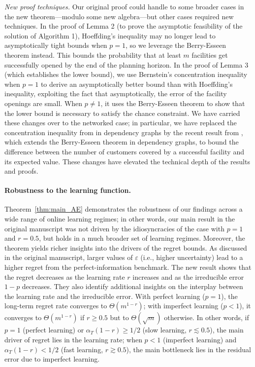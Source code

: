\documentclass[11pt]{article}
\begin{document}
\textit{New proof techniques.}
Our original proof could handle to some broader cases in the new theorem---modulo some new algebra---but other cases required new techniques. In the proof of Lemma 2 (to prove the asymptotic feasibility of the solution of Algorithm 1), Hoeffding's inequality may no longer lead to asymptotically tight bounds when $p=1$, so we leverage the Berry-Esseen theorem instead. This bounds the probability that at least $m$ facilities get successfully opened by the end of the planning horizon. In the proof of Lemma 3 (which establishes the lower bound), we use Bernstein's concentration inequality when $p=1$ to derive an asymptotically better bound than with Hoeffding's inequality, exploiting the fact that asymptotically, the error of the facility openings are small. When $p\neq1$, it uses the Berry-Esseen theorem to show that the lower bound is necessary to satisfy the chance constraint. We have carried these changes over to the networked case; in particular, we have replaced the concentration inequality from \cite{janson2004large} in dependency graphs by the recent result from \cite{janisch2024berry}, which extends the Berry-Esseen theorem in dependency graphs, to bound the difference between the number of customers covered by a successful facility and its expected value. These changes have elevated the technical depth of the results and proofs.

\paragraph{Robustness to the learning function.}

Theorem~\ref{thm:main_AE} demonstrates the robustness of our findings across a wide range of online learning regimes; in other words, our main result in the original manuscript was not driven by the idiosyncracies of the case with $p=1$ and $r=0.5$, but holds in a much broader set of learning regimes. Moreover, the theorem yields richer insights into the drivers of the regret bounds. As discussed in the original manuscript, larger values of $\varepsilon$ (i.e., higher uncertainty) lead to a higher regret from the perfect-information benchmark. The new result shows that the regret decreases as the learning rate $r$ increases and as the irreducible error $1-p$ decreases. They also identify additional insights on the interplay between the learning rate and the irreducible error. With perfect learning ($p=1$), the long-term regret rate converges to $\Theta\left(m^{1-r}\right)$; with imperfect learning ($p<1$), it converges to $\Theta\left(m^{1-r}\right)$ if $r\geq0.5$ but to $\Theta(\sqrt m)$ otherwise. In other words, if $p=1$ (perfect learning) or $\alpha_T(1-r)\geq1/2$ (slow learning, $r\lesssim0.5$), the main driver of regret lies in the learning rate; when $p<1$ (imperfect learning) and $\alpha_T(1-r)<1/2$ (fast learning, $r\gtrsim0.5$), the main bottleneck lies in the residual error due to imperfect learning.
\end{document}
